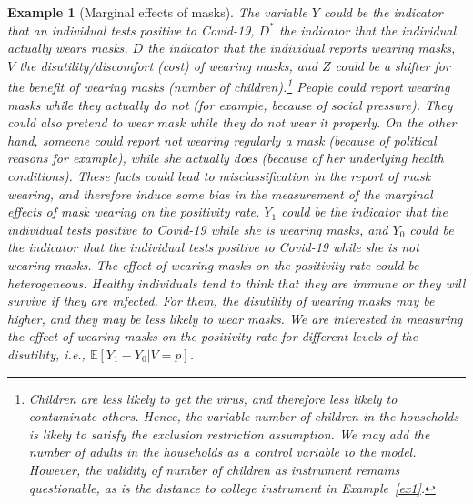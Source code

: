 \documentclass[11pt,reqno]{amsart}
\theoremstyle{plain}
\newtheorem{example}{Example}
\numberwithin{equation}{section}
\begin{document}
\begin{example}[Marginal effects of masks]\label{ex2}
The variable $Y$ could be the indicator that an individual tests positive to Covid-19, $D^*$ the indicator that the individual actually wears masks, $D$ the indicator that the individual reports wearing masks, $V$ the disutility/discomfort (cost) of wearing masks, and $Z$ could be a shifter for the benefit of wearing masks (number of children).\footnote{Children are less likely to get the virus, and therefore less likely to contaminate others. Hence, the variable number of children in the households is likely to satisfy the exclusion restriction assumption. We may add the number of adults in the households as a control variable to the model. However, the validity of number of children as instrument remains questionable, as is the distance to college instrument in Example~\ref{ex1}.} People could report wearing masks while they actually do not (for example, because of social pressure). They could also pretend to wear mask while they do not wear it properly. On the other hand, someone could report not wearing regularly a mask (because of political reasons for example), while she actually does (because of her underlying health conditions). These facts could lead to misclassification in the report of mask wearing, and therefore induce some bias in the measurement of the marginal effects of mask wearing on the positivity rate.  $Y_1$ could be the indicator that the individual tests positive to Covid-19 while she is wearing masks, and $Y_0$ could be the indicator that the individual tests positive to Covid-19 while she is not wearing masks. The effect of wearing masks on the positivity rate could be heterogeneous. Healthy individuals tend to think that they are immune or they will survive if they are infected. For them, the disutility of wearing masks may be higher, and they may be less likely to wear masks. We are interested in measuring the effect of wearing masks on the positivity rate for different levels of the disutility, i.e., $\mathbb E\left[Y_1-Y_0 \vert V=p\right]$. 
\end{example}
\end{document}
